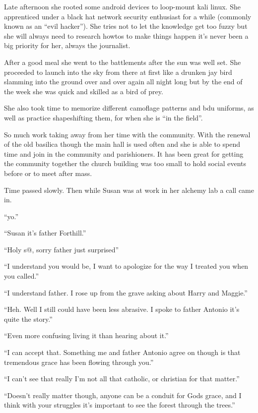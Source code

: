 Late afternoon she rooted some android devices to loop-mount kali linux. She apprenticed under a black hat network security enthusiast for a while (commonly known as an ``evil hacker''). She tries not to let the knowledge get too fuzzy but she will always need to research howtos to make things happen it's never been a big priority for her, always the journalist.

After a good meal she went to the battlements after the sun was well set. She proceeded to launch into the sky from there at first like a drunken jay bird slamming into the ground over and over again all night long but by the end of the week she was quick and skilled as a bird of prey.

She also took time to memorize different camoflage patterns and bdu uniforms, as well as practice shapeshifting them, for when she is ``in the field''.

So much work taking away from her time with the community. With the renewal of the old basilica though the main hall is used often and she is able to spend time and join in the community and parishioners. It has been great for getting the community together the church building was too small to hold social events before or to meet after mass.

Time passed slowly. Then while Susan was at work in her alchemy lab a call came in.

``yo.''

``Susan it's father Forthill.''

``Holy s@, sorry father just surprised''

``I understand you would be, I want to apologize for the way I treated you when you called.''

``I understand father. I rose up from the grave asking about Harry and Maggie.''

``Heh. Well I still could have been less abrasive. I spoke to father Antonio it's quite the story.''

``Even more confusing living it than hearing about it.''

``I can accept that. Something me and father Antonio agree on though is that tremendous grace has been flowing through you.''

``I can't see that really I'm not all that catholic, or christian for that matter.''

``Doesn't really matter though, anyone can be a conduit for Gods grace, and I think with your struggles it's important to see the forest through the trees.''

